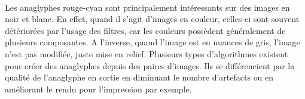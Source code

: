 \paragraph{}	
	Les anaglyphes rouge-cyan sont principalement intéressants sur des images en noir et blanc. En effet, quand il s’agit d’images en couleur, celles-ci sont souvent détériorées par l’usage des filtres, car les couleurs possèdent généralement de plusieurs composantes. A l’inverse, quand l’image est en nuances de gris, l’image n’est pas modifiée, juste mise en relief. Plusieurs types d'algorithmes existent pour créer des anaglyphes depuis des paires d'images. Ils se différencient par la qualité de l'anaglyphe en sortie en diminuant le nombre d'artefacts \cite{steteroAnaglyph} ou en améliorant le rendu pour l'impression \cite{printAnaglyph} par exemple.
